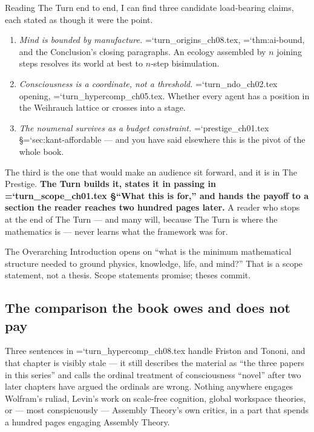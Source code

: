 \documentclass[11pt,letterpaper]{article}
\newcommand{\loc}[1]{{\small\ttfamily\color{accent}\hyphenchar\font=`\-\relax #1}}
\newcommand{\fnd}[1]{\textbf{\color{warn}#1}}
\begin{document}
Reading The Turn end to end, I can find three candidate load-bearing
claims, each stated as though it were the point.

\begin{enumerate}[leftmargin=1.4em,itemsep=3pt]
\item \emph{Mind is bounded by manufacture.}
      \loc{turn\_origins\_ch08.tex}, \loc{thm:ai-bound}, and the
      Conclusion's closing paragraphs. An ecology assembled by $n$
      joining steps resolves its world at best to $n$-step
      bisimulation.
\item \emph{Consciousness is a coordinate, not a threshold.}
      \loc{turn\_ndo\_ch02.tex} opening,
      \loc{turn\_hypercomp\_ch05.tex}. Whether every agent has a
      position in the Weihrauch lattice or crosses into a stage.
\item \emph{The noumenal survives as a budget constraint.}
      \loc{prestige\_ch01.tex} \S\loc{sec:kant-affordable} --- and you
      have said elsewhere this is the pivot of the whole book.
\end{enumerate}

The third is the one that would make an audience sit forward, and it
is in The Prestige. \fnd{The Turn builds it, states it in passing in
\loc{turn\_scope\_ch01.tex} \S``What this is for,'' and hands the
payoff to a section the reader reaches two hundred pages later.} A
reader who stops at the end of The Turn --- and many will, because The
Turn is where the mathematics is --- never learns what the framework
was for.

The Overarching Introduction opens on ``what is the minimum
mathematical structure needed to ground physics, knowledge, life, and
mind?'' That is a scope statement, not a thesis. Scope statements
promise; theses commit.

\subsection*{The comparison the book owes and does not pay}

Three sentences in \loc{turn\_hypercomp\_ch08.tex} handle Friston and
Tononi, and that chapter is visibly stale --- it still describes the
material as ``the three papers in this series'' and calls the ordinal
treatment of consciousness ``novel'' after two later chapters have
argued the ordinals are wrong. Nothing anywhere engages Wolfram's
ruliad, Levin's work on scale-free cognition, global workspace
theories, or --- most conspicuously --- Assembly Theory's own critics,
in a part that spends a hundred pages engaging Assembly Theory.
\end{document}
